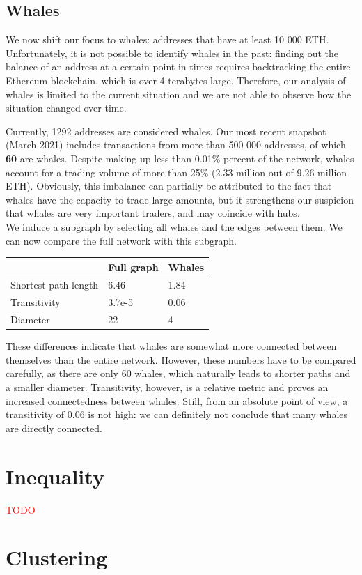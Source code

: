 \documentclass[10pt,a4paper]{article}
\newcommand{\todo}[1]{\textcolor{red}{#1}}
\begin{document}
\begin{multicols}{2}
\subsection{Whales}
We now shift our focus to whales: addresses that have at least 10 000 ETH. Unfortunately, it is not possible to identify whales in the past: finding out the balance of an address at a certain point in times requires backtracking the entire Ethereum blockchain, which is over 4 terabytes large. Therefore, our analysis of whales is limited to the current situation and we are not able to observe how the situation changed over time.

Currently, 1292 addresses are considered whales. Our most recent snapshot (March 2021) includes transactions from more than 500 000 addresses, of which \textbf{60} are whales. Despite making up less than 0.01\% percent of the network, whales account for a trading volume of more than 25\% (2.33 million out of 9.26 million ETH). Obviously, this imbalance can partially be attributed to the fact that whales have the capacity to trade large amounts, but it strengthens our suspicion that whales are very important traders, and may coincide with hubs.\\

We induce a subgraph by selecting all whales and the edges between them. We can now compare the full network with this subgraph.

\vspace{5pt}
\bgroup
\def\arraystretch{1.5}
\begin{tabular}{p{}|p{}|p{}}
 & \textbf{Full graph} & \textbf{Whales} \\ 
\hline 
Shortest path length & 6.46 & 1.84 \\
Transitivity & 3.7e-5 & 0.06\\
Diameter & 22 & 4 \\
\end{tabular}
\egroup
\vspace{5pt}

These differences indicate that whales are somewhat more connected between themselves than the entire network. However, these numbers have to be compared carefully, as there are only 60 whales, which naturally leads to shorter paths and a smaller diameter. Transitivity, however, is a relative metric and proves an increased connectedness between whales. Still, from an absolute point of view, a transitivity of 0.06 is not high: we can definitely not conclude that many whales are directly connected.

\section{Inequality}
\todo{TODO}
\section{Clustering}
\end{multicols}


\end{document}
